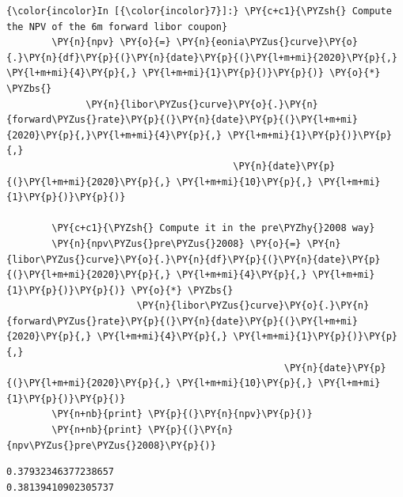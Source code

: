     \begin{Verbatim}[commandchars=\\\{\}]
{\color{incolor}In [{\color{incolor}7}]:} \PY{c+c1}{\PYZsh{} Compute the NPV of the 6m forward libor coupon}
        \PY{n}{npv} \PY{o}{=} \PY{n}{eonia\PYZus{}curve}\PY{o}{.}\PY{n}{df}\PY{p}{(}\PY{n}{date}\PY{p}{(}\PY{l+m+mi}{2020}\PY{p}{,} \PY{l+m+mi}{4}\PY{p}{,} \PY{l+m+mi}{1}\PY{p}{)}\PY{p}{)} \PY{o}{*} \PYZbs{}
              \PY{n}{libor\PYZus{}curve}\PY{o}{.}\PY{n}{forward\PYZus{}rate}\PY{p}{(}\PY{n}{date}\PY{p}{(}\PY{l+m+mi}{2020}\PY{p}{,}\PY{l+m+mi}{4}\PY{p}{,} \PY{l+m+mi}{1}\PY{p}{)}\PY{p}{,} 
                                        \PY{n}{date}\PY{p}{(}\PY{l+m+mi}{2020}\PY{p}{,} \PY{l+m+mi}{10}\PY{p}{,} \PY{l+m+mi}{1}\PY{p}{)}\PY{p}{)}
        
        \PY{c+c1}{\PYZsh{} Compute it in the pre\PYZhy{}2008 way}
        \PY{n}{npv\PYZus{}pre\PYZus{}2008} \PY{o}{=} \PY{n}{libor\PYZus{}curve}\PY{o}{.}\PY{n}{df}\PY{p}{(}\PY{n}{date}\PY{p}{(}\PY{l+m+mi}{2020}\PY{p}{,} \PY{l+m+mi}{4}\PY{p}{,} \PY{l+m+mi}{1}\PY{p}{)}\PY{p}{)} \PY{o}{*} \PYZbs{}
                       \PY{n}{libor\PYZus{}curve}\PY{o}{.}\PY{n}{forward\PYZus{}rate}\PY{p}{(}\PY{n}{date}\PY{p}{(}\PY{l+m+mi}{2020}\PY{p}{,} \PY{l+m+mi}{4}\PY{p}{,} \PY{l+m+mi}{1}\PY{p}{)}\PY{p}{,} 
                                                 \PY{n}{date}\PY{p}{(}\PY{l+m+mi}{2020}\PY{p}{,} \PY{l+m+mi}{10}\PY{p}{,} \PY{l+m+mi}{1}\PY{p}{)}\PY{p}{)}
        \PY{n+nb}{print} \PY{p}{(}\PY{n}{npv}\PY{p}{)}
        \PY{n+nb}{print} \PY{p}{(}\PY{n}{npv\PYZus{}pre\PYZus{}2008}\PY{p}{)}
\end{Verbatim}

    \begin{Verbatim}[commandchars=\\\{\}]
0.37932346377238657
0.38139410902305737

    \end{Verbatim}

